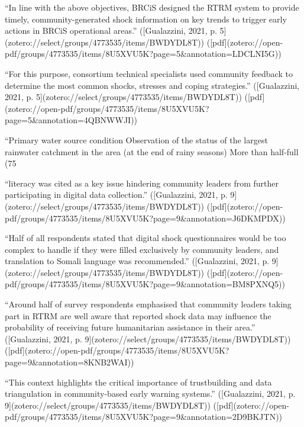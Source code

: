 {“In line with the above objectives, BRCiS designed the RTRM system to provide timely, community-generated shock information on key trends to trigger early actions in BRCiS operational areas.” ([Gualazzini, 2021, p. 5](zotero://select/groups/4773535/items/BWDYDL8T)) ([pdf](zotero://open-pdf/groups/4773535/items/8U5XVU5K?page=5&annotation=LDCLNI5G))

“For this purpose, consortium technical specialists used community feedback to determine the most common shocks, stresses and coping strategies.” ([Gualazzini, 2021, p. 5](zotero://select/groups/4773535/items/BWDYDL8T)) ([pdf](zotero://open-pdf/groups/4773535/items/8U5XVU5K?page=5&annotation=4QBNWWJI))

“Primary water source condition Observation of the status of the largest rainwater catchment in the area (at the end of rainy seasons) More than half-full (75%

“literacy was cited as a key issue hindering community leaders from further participating in digital data collection.” ([Gualazzini, 2021, p. 9](zotero://select/groups/4773535/items/BWDYDL8T)) ([pdf](zotero://open-pdf/groups/4773535/items/8U5XVU5K?page=9&annotation=J6DKMPDX))

“Half of all respondents stated that digital shock questionnaires would be too complex to handle if they were filled exclusively by community leaders, and translation to Somali language was recommended.” ([Gualazzini, 2021, p. 9](zotero://select/groups/4773535/items/BWDYDL8T)) ([pdf](zotero://open-pdf/groups/4773535/items/8U5XVU5K?page=9&annotation=BM8PXNQ5))

“Around half of survey respondents emphasised that community leaders taking part in RTRM are well aware that reported shock data may influence the probability of receiving future humanitarian assistance in their area.” ([Gualazzini, 2021, p. 9](zotero://select/groups/4773535/items/BWDYDL8T)) ([pdf](zotero://open-pdf/groups/4773535/items/8U5XVU5K?page=9&annotation=8KNB2WAI))

“This context highlights the critical importance of trustbuilding and data triangulation in community-based early warning systems.” ([Gualazzini, 2021, p. 9](zotero://select/groups/4773535/items/BWDYDL8T)) ([pdf](zotero://open-pdf/groups/4773535/items/8U5XVU5K?page=9&annotation=2D9BKJTN))

}
